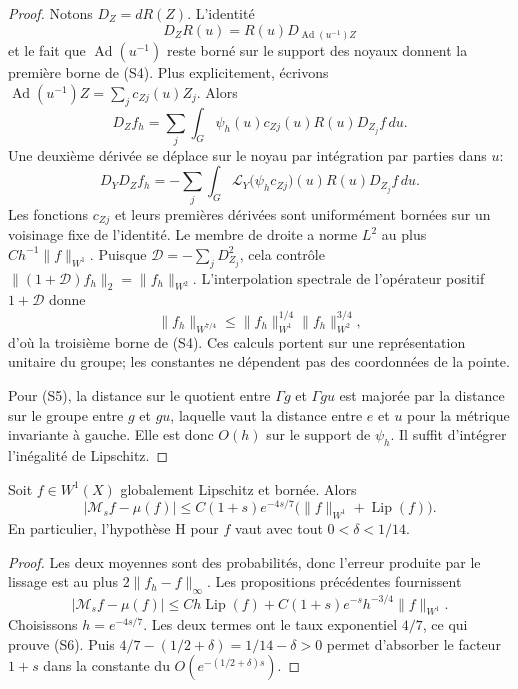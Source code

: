 \begin{proof}
Notons $D_Z=dR(Z)$. L'identité
\[
 D_ZR(u)=R(u)D_{\operatorname{Ad}(u^{-1})Z}
\]
et le fait que $\operatorname{Ad}(u^{-1})$ reste borné sur le support des
noyaux donnent la première borne de (S4). Plus explicitement, écrivons
$\operatorname{Ad}(u^{-1})Z=\sum_j c_{Zj}(u)Z_j$. Alors
\[
 D_Z f_h=\sum_j\int_G\psi_h(u)c_{Zj}(u)R(u)D_{Z_j}f\,du.
\]
Une deuxième dérivée se déplace sur le noyau par intégration par parties
dans $u$:
\[
 D_YD_Z f_h
 =-\sum_j\int_G
    \mathcal L_Y\bigl(\psi_hc_{Zj}\bigr)(u)R(u)D_{Z_j}f\,du.
\]
Les fonctions $c_{Zj}$ et leurs premières dérivées sont uniformément
bornées sur un voisinage fixe de l'identité. Le membre de droite a
norme $L^2$ au plus $Ch^{-1}\|f\|_{W^1}$. Puisque
$\mathcal D=-\sum_jD_{Z_j}^2$, cela contrôle
$\|(1+\mathcal D)f_h\|_2=\|f_h\|_{W^2}$.
L'interpolation spectrale de l'opérateur positif $1+\mathcal D$ donne
\[
 \|f_h\|_{W^{7/4}}
 \le\|f_h\|_{W^1}^{1/4}\|f_h\|_{W^2}^{3/4},
\]
d'où la troisième borne de (S4). Ces calculs portent sur une
représentation unitaire du groupe; les constantes ne dépendent pas
des coordonnées de la pointe.

Pour (S5), la distance sur le quotient entre $\Gamma g$ et $\Gamma gu$
est majorée par la distance sur le groupe entre $g$ et $gu$, laquelle
vaut la distance entre $e$ et $u$ pour la métrique invariante à gauche.
Elle est donc $O(h)$ sur le support de $\psi_h$. Il suffit d'intégrer
l'inégalité de Lipschitz.
\end{proof}

\begin{theorem}
Soit $f\in W^1(X)$ globalement Lipschitz et bornée. Alors
\[
 |\mathcal M_s f-\mu(f)|
 \le C(1+s)e^{-4s/7}
       \bigl(\|f\|_{W^1}+\operatorname{Lip}(f)\bigr).
 \tag{S6}
\]
En particulier, l'hypothèse H pour $f$ vaut avec tout
$0<\delta<1/14$.
\end{theorem}

\begin{proof}
Les deux moyennes sont des probabilités, donc l'erreur produite par le
lissage est au plus $2\|f_h-f\|_\infty$. Les propositions précédentes
fournissent
\[
 |\mathcal M_s f-\mu(f)|
 \le Ch\operatorname{Lip}(f)
      +C(1+s)e^{-s}h^{-3/4}\|f\|_{W^1}.
\]
Choisissons $h=e^{-4s/7}$. Les deux termes ont le taux exponentiel
$4/7$, ce qui prouve (S6). Puis
$4/7-(1/2+\delta)=1/14-\delta>0$ permet d'absorber le facteur $1+s$
dans la constante du $O(e^{-(1/2+\delta)s})$.
\end{proof}

